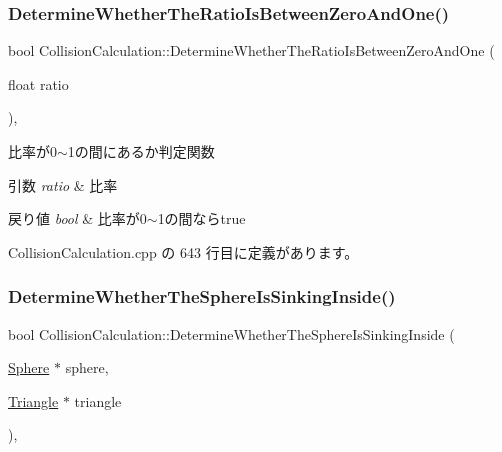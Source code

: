 \subsubsection{\texorpdfstring{Determine\+Whether\+The\+Ratio\+Is\+Between\+Zero\+And\+One()}{DetermineWhetherTheRatioIsBetweenZeroAndOne()}}
{\footnotesize\ttfamily bool Collision\+Calculation\+::\+Determine\+Whether\+The\+Ratio\+Is\+Between\+Zero\+And\+One (\begin{DoxyParamCaption}\item[{float}]{ratio }\end{DoxyParamCaption})\hspace{0.3cm}{\ttfamily [static]}, {\ttfamily [private]}}



比率が0$\sim$1の間にあるか判定関数 


\begin{DoxyParams}{引数}
{\em ratio} & 比率 \\
\hline
\end{DoxyParams}

\begin{DoxyRetVals}{戻り値}
{\em bool} & 比率が0$\sim$1の間ならtrue \\
\hline
\end{DoxyRetVals}


 Collision\+Calculation.\+cpp の 643 行目に定義があります。

\mbox{\label{class_collision_calculation_a8878c4e262eb7027f4ae147a24c7ba33}} 
\subsubsection{\texorpdfstring{Determine\+Whether\+The\+Sphere\+Is\+Sinking\+Inside()}{DetermineWhetherTheSphereIsSinkingInside()}}
{\footnotesize\ttfamily bool Collision\+Calculation\+::\+Determine\+Whether\+The\+Sphere\+Is\+Sinking\+Inside (\begin{DoxyParamCaption}\item[{\mbox{\hyperlink{class_sphere}{Sphere}} $\ast$}]{sphere,  }\item[{\mbox{\hyperlink{class_triangle}{Triangle}} $\ast$}]{triangle }\end{DoxyParamCaption})\hspace{0.3cm}{\ttfamily [static]}, {\ttfamily [private]}}



